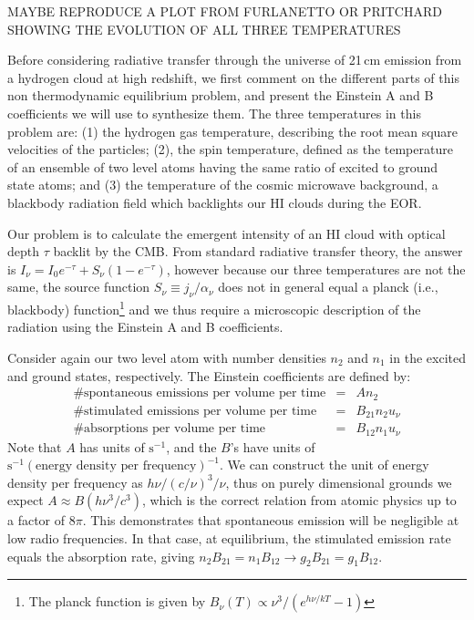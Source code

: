 MAYBE REPRODUCE A PLOT FROM FURLANETTO OR PRITCHARD SHOWING THE EVOLUTION OF ALL THREE TEMPERATURES

Before considering radiative transfer through the universe of 21\,cm emission from a hydrogen cloud at high redshift, we first comment on the different parts of this non thermodynamic equilibrium problem, and present the Einstein A and B coefficients we will use to synthesize them. The three temperatures in this problem are: (1) the hydrogen gas temperature, describing the root mean square velocities of the particles; (2), the spin temperature, defined as the temperature of an ensemble of two level atoms having the same ratio of excited to ground state atoms; and (3) the temperature of the cosmic microwave background, a blackbody radiation field which backlights our HI clouds during the EOR. 

Our problem is to calculate the emergent intensity of an HI cloud with optical depth $\tau$ backlit by the CMB. From standard radiative transfer theory, the answer is $I_\nu=I_0e^{-\tau}+S_\nu(1-e^{-\tau})$, however because our three temperatures are not the same, the source function $S_\nu\equiv j_\nu/\alpha_\nu$ does not in general equal a planck (i.e., blackbody) function\footnote{The planck function is given by $B_\nu(T)\propto\nu^3/(e^{h\nu/kT}-1)$} and we thus require a microscopic description of the radiation using the Einstein A and B coefficients.

Consider again our two level atom with number densities $n_2$ and $n_1$ in the excited and ground states, respectively. The Einstein coefficients are defined by:
\begin{eqnarray}
\text{\# spontaneous emissions per volume per time}&=&An_2 \nonumber\\
\text{\# stimulated emissions per volume per time}&=&B_{21}n_2u_\nu \nonumber\\
\text{\# absorptions per volume per time}&=&B_{12}n_1u_\nu 
\end{eqnarray}
Note that $A$ has units of $\text{s}^{-1}$, and the $B$'s have units of $\text{s}^{-1}(\text{energy density per frequency})^{-1}$. We can construct the unit of energy density per frequency as $h\nu/(c/\nu)^3/\nu$, thus on purely dimensional grounds we expect $A\approx B (h\nu^3/c^3)$, which is the correct relation from atomic physics up to a factor of $8\pi$. This demonstrates that spontaneous emission will be negligible at low radio frequencies. In that case, at equilibrium, the stimulated emission rate equals the absorption rate, giving $n_2B_{21}=n_1B_{12}\to g_2B_{21}=g_1B_{12}$.

